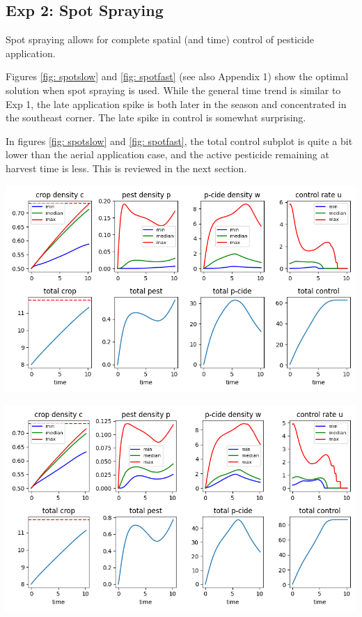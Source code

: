 \documentclass[11pt]{article}
\begin{document}
\subsection{Exp 2: Spot Spraying}

Spot spraying allows for complete spatial (and time) control of pesticide application.

Figures \ref{fig: spotslow} and \ref{fig: spotfast} (see also Appendix 1) show the optimal solution when spot spraying is used. While the general time trend is similar to Exp 1, the late application spike is both later in the season and concentrated in the southeast corner. The late spike in control is somewhat surprising.

In figures \ref{fig: spotslow} and \ref{fig: spotfast}, the total control subplot is quite a bit lower than the aerial application case, and the active pesticide remaining at harvest time is less. This is reviewed in the next section.

\begin{minipage}{\textwidth}
	\begin{center}
		\includegraphics[width=0.8\linewidth]{../resim_240718-033400/time.png}
		\label{fig: spotslow}
	\end{center}
\end{minipage}

\begin{minipage}{\textwidth}
	\begin{center}
		\includegraphics[width=0.8\linewidth]{../resim_240718-012904/time.png}
		\label{fig: spotfast}
	\end{center}
\end{minipage}
\end{document}
